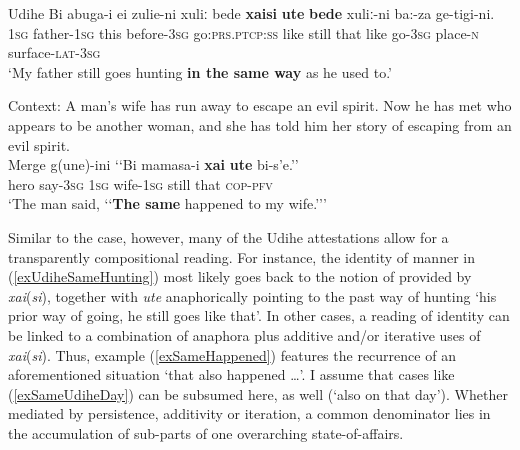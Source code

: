 \begin{exe}
	\ex 
	\begin{xlist}
		\exi{}Udihe
		\ex 	\label{exUdiheSameHunting}
	 \gll Bi abuga-i ei zulie-ni xuliː bede \textbf{xaisi} \textbf{ute} \textbf{bede} xuliː-ni ba:-za ge-tigi-ni.\\
1\textsc{sg} father-1\textsc{sg} this before-3\textsc{sg} go:\textsc{prs}.\textsc{ptcp}:\textsc{ss} like still that like go-3\textsc{sg} place-\textsc{n} surface-\textsc{lat}-3\textsc{sg}\\
	\glt \lq My father still goes hunting \textbf{in the same way} as he used to.\rq{}
	\\\parencite[398–399]{NikolaevaTolskaya2001}
	
		\ex Context: A man's wife has run away to escape an evil spirit. Now he has met who appears to be another woman, and she has told him her story of escaping from an evil spirit.\label{exSameHappened}\\
		\gll Merge g(une)-ini \lq\lq{}Bi mamasa-i \textbf{xai} \textbf{ute} bi-s’e.\rq\rq\\
	hero say-3\textsc{sg} \phantom{\lq\lq}1\textsc{sg} wife-1\textsc{sg} still that \textsc{cop}-\textsc{pfv}\\ 
		\glt \lq The man said, \lq\lq{}\textbf{The same} happened to my wife.{\rq\rq }\rq{}
	\\\parencite[76–77]{NikolaevaEtAl2003}
	\end{xlist}
\end{exe}

Similar to the  case, however, many of the Udihe attestations allow for a transparently compositional reading. For instance, the identity of manner in (\ref{exUdiheSameHunting}) most likely goes back to the notion of  provided by \mbox{\textit{xai}(\textit{si})}, together with \textit{ute} anaphorically pointing to the past way of hunting \lq his prior way of going, he still goes like that\rq{}. In other cases, a reading of identity can be linked to a combination of anaphora plus additive and/or iterative uses of \mbox{\textit{xai}(\textit{si})}. Thus, example (\ref{exSameHappened}) features the recurrence of an aforementioned situation \lq that also happened …\rq{}. I assume that cases like (\ref{exSameUdiheDay}) can be subsumed here, as well (\lq also on that day\rq{}). Whether mediated by persistence, additivity or iteration, a common denominator lies in the accumulation of sub-parts of one overarching state-of-affairs.

